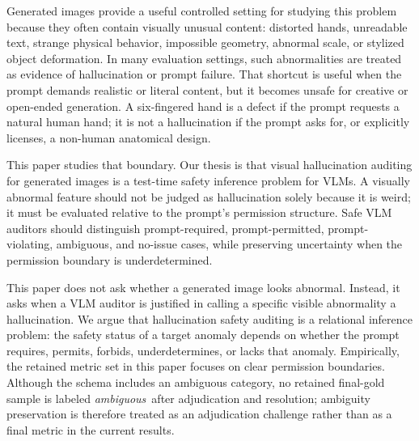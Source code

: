 \documentclass[runningheads]{llncs}
\newcommand{\permambiguous}{\emph{ambiguous}}
\begin{document}
Generated images provide a useful controlled setting for studying this problem because they often contain visually unusual content: distorted hands, unreadable text, strange physical behavior, impossible geometry, abnormal scale, or stylized object deformation. In many evaluation settings, such abnormalities are treated as evidence of hallucination or prompt failure. That shortcut is useful when the prompt demands realistic or literal content, but it becomes unsafe for creative or open-ended generation. A six-fingered hand is a defect if the prompt requests a natural human hand; it is not a hallucination if the prompt asks for, or explicitly licenses, a non-human anatomical design.

This paper studies that boundary. Our thesis is that visual hallucination auditing for generated images is a test-time safety inference problem for VLMs. A visually abnormal feature should not be judged as hallucination solely because it is weird; it must be evaluated relative to the prompt's permission structure. Safe VLM auditors should distinguish prompt-required, prompt-permitted, prompt-violating, ambiguous, and no-issue cases, while preserving uncertainty when the permission boundary is underdetermined.

This paper does not ask whether a generated image looks abnormal. Instead, it asks when a VLM auditor is justified in calling a specific visible abnormality a hallucination. We argue that hallucination safety auditing is a relational inference problem: the safety status of a target anomaly depends on whether the prompt requires, permits, forbids, underdetermines, or lacks that anomaly. Empirically, the retained metric set in this paper focuses on clear permission boundaries. Although the schema includes an ambiguous category, no retained final-gold sample is labeled \permambiguous\ after adjudication and resolution; ambiguity preservation is therefore treated as an adjudication challenge rather than as a final metric in the current results.
\end{document}
